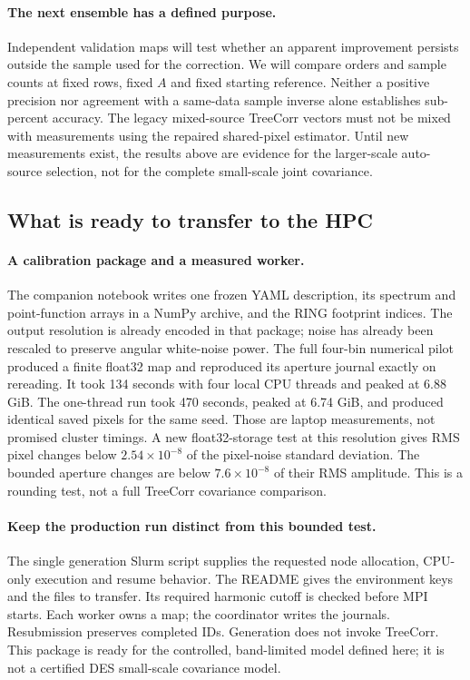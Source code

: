 \documentclass[11pt]{article}
\begin{document}
\paragraph{The next ensemble has a defined purpose.}
Independent validation maps will test whether an apparent improvement
persists outside the sample used for the correction. We will compare
orders and sample counts at fixed rows, fixed $A$ and fixed starting
reference. Neither a positive precision nor agreement with a same-data
sample inverse alone establishes sub-percent accuracy. The legacy
mixed-source TreeCorr vectors must not be mixed with measurements using
the repaired shared-pixel estimator. Until new measurements exist, the
results above are evidence for the larger-scale auto-source selection,
not for the complete small-scale joint covariance.

\subsection{What is ready to transfer to the HPC}
\paragraph{A calibration package and a measured worker.}
The companion notebook writes one frozen YAML description, its spectrum
and point-function arrays in a NumPy archive, and the RING footprint
indices. The output resolution is already encoded in that package;
noise has already been rescaled to preserve angular white-noise power.
The full four-bin numerical pilot produced a finite float32 map and
reproduced its aperture journal exactly on rereading. It took 134 seconds
with four local CPU threads and peaked at 6.88 GiB. The one-thread run took 470 seconds, peaked at 6.74 GiB,
and produced identical saved pixels for the same seed. Those are laptop
measurements, not promised cluster timings. A new float32-storage test at
this resolution gives RMS pixel changes below $2.54\times10^{-8}$ of
the pixel-noise standard deviation. The bounded aperture changes are below
$7.6\times10^{-8}$ of their RMS amplitude. This is a rounding test, not
a full TreeCorr covariance comparison.

\paragraph{Keep the production run distinct from this bounded test.}
The single generation Slurm script supplies the requested node allocation,
CPU-only execution and resume behavior. The README gives the environment
keys and the files to transfer. Its required harmonic cutoff is checked
before MPI starts. Each worker owns a map; the coordinator writes the
journals. Resubmission preserves completed IDs. Generation does not invoke
TreeCorr. This package is ready for the controlled, band-limited model
defined here; it is not a certified DES small-scale covariance model.
\end{document}

